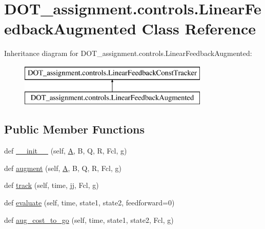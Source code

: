 \hypertarget{class_d_o_t__assignment_1_1controls_1_1_linear_feedback_augmented}{}\section{D\+O\+T\+\_\+assignment.\+controls.\+Linear\+Feedback\+Augmented Class Reference}
\label{class_d_o_t__assignment_1_1controls_1_1_linear_feedback_augmented}
Inheritance diagram for D\+O\+T\+\_\+assignment.\+controls.\+Linear\+Feedback\+Augmented\+:\begin{figure}[H]
\begin{center}
\leavevmode
\includegraphics[height=2.000000cm]{class_d_o_t__assignment_1_1controls_1_1_linear_feedback_augmented}
\end{center}
\end{figure}
\subsection*{Public Member Functions}
\begin{DoxyCompactItemize}
\item 
def \mbox{\hyperlink{class_d_o_t__assignment_1_1controls_1_1_linear_feedback_augmented_adaa4957b87782b3bd7df59ff4ab36080}{\+\_\+\+\_\+init\+\_\+\+\_\+}} (self, \mbox{\hyperlink{class_d_o_t__assignment_1_1controls_1_1_linear_feedback_const_tracker_ae6ca89f8631d4f212e60a7bcdd1a1c7f}{A}}, B, Q, R, Fcl, g)
\item 
def \mbox{\hyperlink{class_d_o_t__assignment_1_1controls_1_1_linear_feedback_augmented_a715cfd0c38823a3c46edf554db334112}{augment}} (self, \mbox{\hyperlink{class_d_o_t__assignment_1_1controls_1_1_linear_feedback_const_tracker_ae6ca89f8631d4f212e60a7bcdd1a1c7f}{A}}, B, Q, R, Fcl, g)
\item 
def \mbox{\hyperlink{class_d_o_t__assignment_1_1controls_1_1_linear_feedback_augmented_ab52bf025cb9fdd7bb77e127f266a840f}{track}} (self, time, jj, Fcl, g)
\item 
def \mbox{\hyperlink{class_d_o_t__assignment_1_1controls_1_1_linear_feedback_augmented_a26dcf6b78da5ffb31084187cb52f18c1}{evaluate}} (self, time, state1, state2, feedforward=0)
\item 
def \mbox{\hyperlink{class_d_o_t__assignment_1_1controls_1_1_linear_feedback_augmented_ab0ec1f6c8ba4ea11ce15eb4b88c54675}{aug\+\_\+cost\+\_\+to\+\_\+go}} (self, time, state1, state2, Fcl, g)
\end{DoxyCompactItemize}
